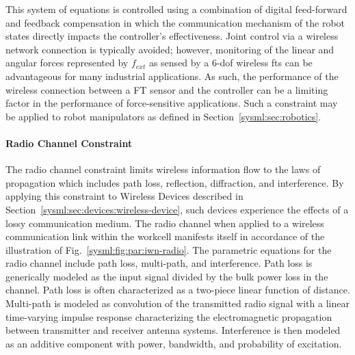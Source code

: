 This system of equations is controlled using a combination of digital feed-forward and feedback compensation in which the communication mechanism of the robot states directly impacts the controller's effectiveness. Joint control via a wireless network connection is typically avoided; however, monitoring of the linear and angular forces represented by $f_{\!ext}$ as sensed by a 6-\gls{dof} wireless \gls{fts} can be advantageous for many industrial applications.  As such, the performance of the wireless connection between a FT sensor and the controller can be a limiting factor in the performance of force-sensitive applications. Such a constraint may be applied to robot manipulators as defined in Section~\ref{sysml:sec:robotics}.

\paragraph{Radio Channel Constraint}\label{sysml:sec:constraints:radio}

The radio channel constraint limits wireless information flow to the laws of propagation which includes path loss, reflection, diffraction, and interference.  By applying this constraint to Wireless Devices described in Section~\ref{sysml:sec:devices:wireless-device}, such devices experience the effects of a lossy communication medium. The radio channel when applied to a wireless communication link within the workcell manifests itself in accordance of the illustration of Fig.~\ref{sysml:fig:par:iwn-radio}.  The parametric equations for the radio channel include path loss, multi-path, and interference.  Path loss is generically modeled as the input signal divided by the bulk power loss in the channel. Path loss is often characterized as a two-piece linear function of distance\cite{Candell2017.NIST1951}. Multi-path is modeled as convolution of the transmitted radio signal with a linear time-varying impulse response characterizing the electromagnetic propagation between transmitter and receiver antenna systems.  Interference is then modeled as an additive component with power, bandwidth, and probability of excitation.


